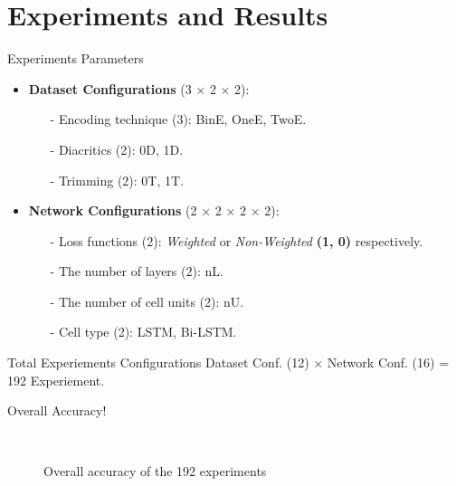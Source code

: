 
%	


\section{Experiments and Results}

\begin{frame}[fragile]{Experiments Parameters}
\begin{itemize}
	\item \textbf{Dataset Configurations} (3 $\times$ 2 $\times$ 2):
	\begin{itemize}
		\item [-] Encoding technique (3): BinE, OneE, TwoE.
		\item [-] Diacritics (2): 0D, 1D.
		\item [-] Trimming (2): 0T, 1T.
	\end{itemize}
\item \textbf{Network Configurations} (2 $\times$ 2 $\times$ 2 $\times$ 2):
\begin{itemize}
\item [-] Loss functions (2): \textit{Weighted} or \textit{Non-Weighted } \textbf{(1, 0)} respectively.
\item [-] The number of layers (2): nL.
\item [-] The number of cell units (2): nU.
\item [-] Cell type (2): LSTM, Bi-LSTM.
\end{itemize}
\end{itemize}
\begin{block}{Total Experiements Configurations}
	Dataset Conf. (12) $\times$ Network Conf. (16) = 192 Experiement.
\end{block}
\end{frame}
\begin{frame}[fragile]{Overall Accuracy!}


\begin{figure}[!t]
	
	\caption{Overall accuracy of the 192 experiments}~\label{Fig:ArabicModelsResults}
\end{figure}

\end{frame}


